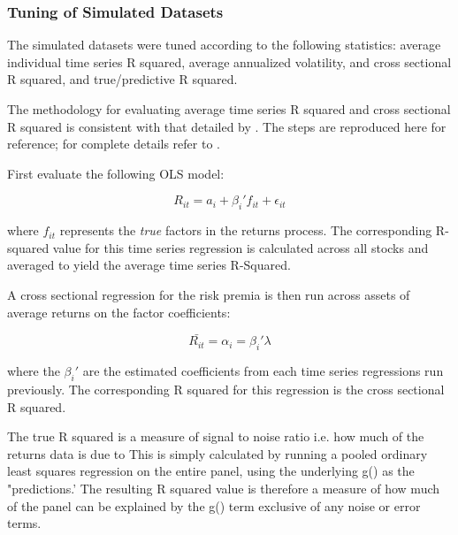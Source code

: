 \documentclass[a4paper, table]{article}
\begin{document}
\subsubsection{Tuning of Simulated Datasets}

The simulated datasets were tuned according to the following statistics: average individual time series R squared, average annualized volatility, and cross sectional R squared, and true/predictive R squared.

The methodology for evaluating average time series R squared and cross sectional R squared is consistent with that detailed by \cite{cochrane_asset_2005}. The steps are reproduced here for reference; for complete details refer to \cite{cochrane_asset_2005}.

First evaluate the following OLS model:

\begin{equation}
	R_{it} = a_i + \beta_i' f_{it} + \epsilon_{it} 
\end{equation}

where $f_{it}$ represents the \textit{true} factors in the returns process. The corresponding R-squared value for this time series regression is calculated across all stocks and averaged to yield the average time series R-Squared. 

A cross sectional regression for the risk premia is then run across assets of average returns on the factor coefficients:

\begin{equation}
	\bar{R_{it}} = \alpha_i = \beta_i' \lambda
\end{equation}

where the $\beta_i'$ are the estimated coefficients from each time series regressions run previously. The corresponding R squared for this regression is the cross sectional R squared.

The true R squared is a measure of signal to noise ratio i.e. how much of the returns data is due to 
This is simply calculated by running a pooled ordinary least squares regression on the entire panel, using the underlying g() as the "predictions.' The resulting R squared value is therefore a measure of how much of the panel can be explained by the g() term exclusive of any noise or error terms.




\end{document}
